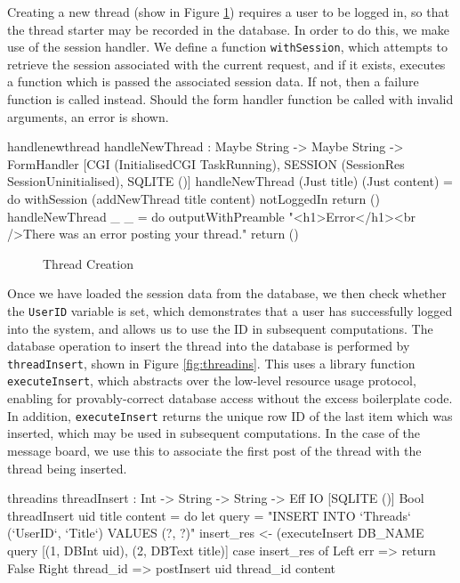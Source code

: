 \noindent
Creating a new thread (show in Figure \ref{fig:handlethread})
requires a user to be logged in, so that the thread
starter may be recorded in the database. In order to do this, we make use of
the session handler. We define a function \texttt{withSession}, which attempts
to retrieve the session associated with the current request, and if it exists,
executes a function which is passed the associated session data. If not, then a
failure function is called instead. Should the form handler function be called
with invalid arguments, an error is shown.

\begin{SaveVerbatim}{handlenewthread}
handleNewThread : 
  Maybe String -> Maybe String -> 
  FormHandler [CGI (InitialisedCGI TaskRunning), 
               SESSION (SessionRes SessionUninitialised), 
               SQLITE ()]  
handleNewThread (Just title) (Just content) = do 
  withSession (addNewThread title content) notLoggedIn
  return ()
handleNewThread _ _ = do 
  outputWithPreamble "<h1>Error</h1><br />There was 
       an error posting your thread."
  return ()
\end{SaveVerbatim}

\begin{figure}[h]
\caption{Thread Creation}
\label{fig:handlethread}
\end{figure}

\noindent
Once we have loaded the session data from the database, we then check whether
the \texttt{UserID} variable is set, which demonstrates that a user has
successfully logged into the system, and allows us to use the ID in subsequent
computations. The database operation to insert the thread into the database is
performed by \texttt{threadInsert}, shown in Figure \ref{fig:threadins}.
This uses a library function \texttt{executeInsert}, which abstracts over the
low-level resource usage protocol, enabling for provably-correct database
access without the excess boilerplate code. In addition, \texttt{executeInsert}
returns the unique row ID of the last item which was inserted, which may be
used in subsequent computations. In the case of the message board, we use this
to associate the first post of the thread with the thread being inserted.

\begin{SaveVerbatim}{threadins}
threadInsert : Int -> String -> String -> 
               Eff IO [SQLITE ()] Bool
threadInsert uid title content = do
  let query = "INSERT INTO `Threads` 
    (`UserID`, `Title`) VALUES (?, ?)"
  insert_res <- (executeInsert DB_NAME query 
    [(1, DBInt uid), (2, DBText title)]
  case insert_res of
    Left err => return False
    Right thread_id => postInsert uid thread_id content
\end{SaveVerbatim}

